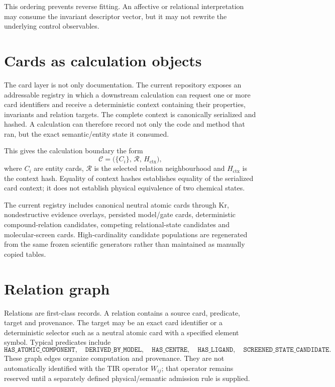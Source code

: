 This ordering prevents reverse fitting. An affective or relational interpretation may consume the invariant descriptor vector, but it may not rewrite the underlying control observables.

\section{Cards as calculation objects}
The card layer is not only documentation.  The current repository exposes an addressable registry in which a downstream calculation can request one or more card identifiers and receive a deterministic context containing their properties, invariants and relation targets.  The complete context is canonically serialized and hashed.  A calculation can therefore record not only the code and method that ran, but the exact semantic/entity state it consumed.

This gives the calculation boundary the form
\begin{equation}
\mathcal C=\bigl(\{C_i\},\,\mathcal R,\,H_{\mathrm{ctx}}\bigr),
\end{equation}
where $C_i$ are entity cards, $\mathcal R$ is the selected relation neighbourhood and $H_{\mathrm{ctx}}$ is the context hash.  Equality of context hashes establishes equality of the serialized card context; it does not establish physical equivalence of two chemical states.

The current registry includes canonical neutral atomic cards through Kr, nondestructive evidence overlays, persisted model/gate cards, deterministic compound-relation candidates, competing relational-state candidates and molecular-screen cards.  High-cardinality candidate populations are regenerated from the same frozen scientific generators rather than maintained as manually copied tables.

\section{Relation graph}
Relations are first-class records.  A relation contains a source card, predicate, target and provenance.  The target may be an exact card identifier or a deterministic selector such as a neutral atomic card with a specified element symbol.  Typical predicates include
\begin{equation}
\texttt{HAS\_ATOMIC\_COMPONENT},\quad
\texttt{DERIVED\_BY\_MODEL},\quad
\texttt{HAS\_CENTRE},\quad
\texttt{HAS\_LIGAND},\quad
\texttt{SCREENED\_STATE\_CANDIDATE}.
\end{equation}
These graph edges organize computation and provenance.  They are not automatically identified with the TIR operator $W_{ij}$; that operator remains reserved until a separately defined physical/semantic admission rule is supplied.

